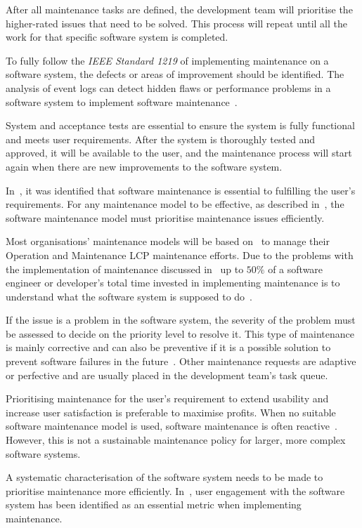\par After all maintenance tasks are defined, the development team will prioritise the higher-rated issues that need to be solved. This process will repeat until all the work for that specific software system is completed. 

\par To fully follow the \textit{IEEE Standard 1219} of implementing maintenance on a software system, the defects or areas of improvement should be identified. The analysis of event logs can detect hidden flaws or performance problems in a software system to implement software maintenance~\cite{Cinque2013, Rong2018a, Levin2019}.

\par System and acceptance tests are essential to ensure the system is fully functional and meets user requirements. After the system is thoroughly tested and approved, it will be available to the user, and the maintenance process will start again when there are new improvements to the software system.\par In~, it was identified that software maintenance is essential to fulfilling the user's requirements. For any maintenance model to be effective, as described in~, the software maintenance model must prioritise maintenance issues efficiently. \par Most organisations' maintenance models will be based on~ to manage their Operation and Maintenance LCP maintenance efforts. Due to the problems with the implementation of maintenance discussed in~ up to $50\%$ of a software engineer or developer's total time invested in implementing maintenance is to understand what the software system is supposed to do~\cite{Tang2010}. \par If the issue is a problem in the software system, the severity of the problem must be assessed to decide on the priority level to resolve it. This type of maintenance is mainly corrective and can also be preventive if it is a possible solution to prevent software failures in the future~\cite{Tang2010}. Other maintenance requests are adaptive or perfective and are usually placed in the development team's task queue. \par Prioritising maintenance for the user's requirement to extend usability and increase user satisfaction is preferable to maximise profits. When no suitable software maintenance model is used, software maintenance is often reactive~\cite{Araujo2021}. However, this is not a sustainable maintenance policy for larger, more complex software systems. \par A systematic characterisation of the software system needs to be made to prioritise maintenance more efficiently. In~, user engagement with the software system has been identified as an essential metric when implementing maintenance.

